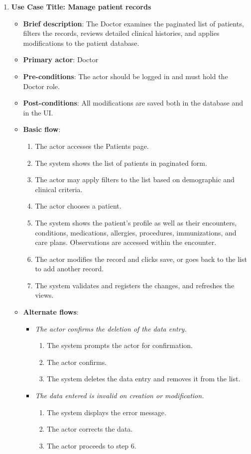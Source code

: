 \begin{enumerate}
\vspace{0.5em}

\item \textbf{Use Case Title: Manage patient records}
\begin{itemize}
    \item \textbf{Brief description}: The Doctor examines the paginated list of patients, filters the records, reviews detailed clinical histories, and applies modifications to the patient database.
    \item \textbf{Primary actor}: Doctor
    \item \textbf{Pre-conditions}: The actor should be logged in and must hold the Doctor role.
    \item \textbf{Post-conditions}: All modifications are saved both in the database and in the UI.
    \item \textbf{Basic flow}:
    \begin{enumerate}
        \item The actor accesses the Patients page.
        \item The system shows the list of patients in paginated form.
        \item The actor may apply filters to the list based on demographic and clinical criteria.
        \item The actor chooses a patient.
        \item The system shows the patient's profile as well as their encounters, conditions, medications, allergies, procedures, immunizations, and care plans. Observations are accessed within the encounter.
        \item The actor modifies the record and clicks save, or goes back to the list to add another record.
        \item The system validates and registers the changes, and refreshes the views.
    \end{enumerate}
    \item \textbf{Alternate flows}:
    \begin{itemize}
        \item[6a.] \textit{The actor confirms the deletion of the data entry.}
        \begin{enumerate}
            \item The system prompts the actor for confirmation.
            \item The actor confirms.
            \item The system deletes the data entry and removes it from the list.
        \end{enumerate}
        \item[7a.] \textit{The data entered is invalid on creation or modification.}
        \begin{enumerate}
            \item The system displays the error message.
            \item The actor corrects the data.
            \item The actor proceeds to step 6.
        \end{enumerate}
    \end{itemize}
\end{itemize}


\end{enumerate}

